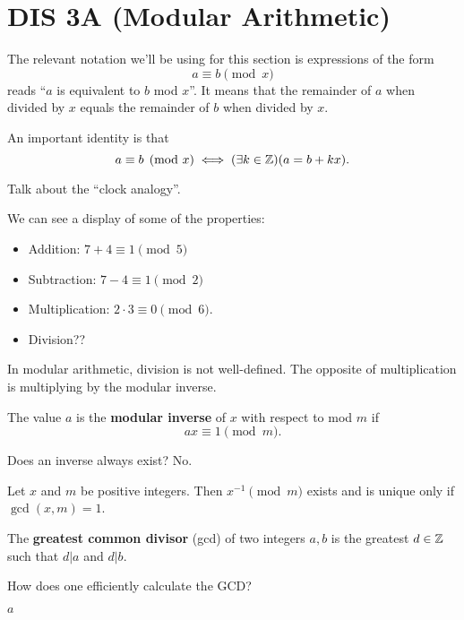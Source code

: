 \section{DIS 3A (Modular Arithmetic)} 

The relevant notation we'll be using for this section is expressions of the form \[ a \equiv b \pmod{x} \] reads ``$a$ is equivalent to $b$ mod $x$''. It means that the remainder of $a$ when divided by $x$ equals the remainder of $b$ when divided by $x$. 

An important identity is that \[ a \equiv b \pmod{x} \iff (\exists k \in\operatorname{\mathbb{Z}}) (a = b + kx). \]

Talk about the ``clock analogy''. 

\begin{example}
    We can see a display of some of the properties:
    \begin{itemize}
        \item Addition: $7 + 4 \equiv 1 \pmod{5}$
        \item Subtraction: $7 - 4 \equiv 1 \pmod{2}$ 
        \item Multiplication: $2 \cdot 3 \equiv 0 \pmod{6}$. 
        \item Division??
    \end{itemize}
\end{example}

In modular arithmetic, division is not well-defined. The opposite of multiplication is multiplying by the modular inverse. 

\begin{definition}
    The value $a$ is the \textbf{modular inverse} of $x$ with respect to mod $m$ if \[ ax \equiv 1 \pmod{m}. \]
\end{definition}

Does an inverse always exist? No. 

\begin{theorem}
    Let $x$ and $m$ be positive integers. Then $x^{-1} \pmod{m}$ exists and is unique only if $\gcd(x,m) = 1$. 
\end{theorem}

\begin{definition}
    The \textbf{greatest common divisor} (gcd) of two integers $a, b$ is the greatest $d \in \operatorname{\mathbb{Z}}$ such that $d|a$ and $d|b$. 
\end{definition}

How does one efficiently calculate the GCD?

\begin{algothm}
    \begin{algorithmic}
        \State \Return $a$
    \EndIf
    \State \Return {}
    \EndFunction
    \end{algorithmic}
\end{algothm}